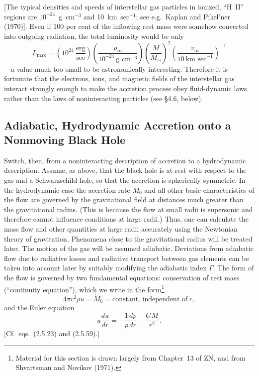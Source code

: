 [The typical densities and speeds of interstellar gas particles in ionized, ``H~II''
regions are $10^{-24}$~g~cm$^{-3}$ and 10~km~sec$^{-1}$; see e.g.\ Kaplan and Pikel'ner (1970)].
Even if 100 per cent of the inflowing rest mass were somehow converted into
outgoing radiation, the total luminosity would be only
%
\begin{equation}
L_\text{max} = \left(10^{24}~\frac{\text{erg}}{\text{sec}}\right) \left(\frac{\rho_\infty}{10^{-24}~\text{g~cm}^{-3}}\right) \left(\frac{M}{M_\odot}\right)^2 \left(\frac{v_\infty}{10~\text{km~sec}^{-1}}\right)^{-1}
\tag{4.1.4}
\end{equation}
%
---a value much too small to be astronomically interesting. Therefore it is fortunate
that the electrons, ions, and magnetic fields of the interstellar gas interact strongly
enough to make the accretion process obey fluid-dynamic laws rather than the
laws of noninteracting particles (see \S4.6, below).


\subsection{Adiabatic, Hydrodynamic Accretion onto a Nonmoving Black Hole}
\label{sec:4.2}

Switch, then, from a noninteracting description of accretion to a hydrodynamic
description. Assume, as above, that the black hole is at rest with respect to the gas
and a Schwarzschild hole, so that the accretion is spherically symmetric. In the
hydrodynamic case the accretion rate $\dot{M}_0$ and all other basic characteristics of the
flow are governed by the gravitational field at distances much greater than the
gravitational radius. (This is because the flow at small radii is supersonic and
therefore cannot influence conditions at large radii.) Thus, one can calculate
the mass flow and other quantities at large radii accurately using the Newtonian
theory of gravitation. Phenomena close to the gravitational radius will be treated
later. The motion of the gas will be assumed adiabatic. Deviations from adiabatic
flow due to radiative losses and radiative transport between gas elements can be
taken into account later by suitably modifying the adiabatic index $\Gamma$.
The form of the flow is governed by two fundamental equations: conservation
of rest mass (``continuity equation''), which we write in the form\footnote{Material for this section is drawn largely from Chapter~13 of ZN, and from Shvartsman and Novikov (1971).}
%
\begin{equation}
4\pi r^2 \rho u = \dot{M}_0 = \text{constant, independent of}~r,
\tag{4.2.1}
\end{equation}
%
and the Euler equation
%
\begin{equation}
u\frac{du}{dr} = -\frac{1}{\rho}\frac{dp}{dr} - \frac{GM}{r^2}\,.
\tag{4.2.2}
\end{equation}
%
[Cf.\ eqs.\ (2.5.23) and (2.5.59).]

